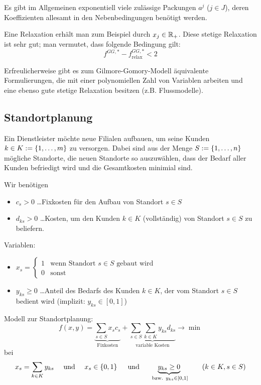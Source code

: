 \begin{description}
	Es gibt im Allgemeinen exponentiell viele zulässige Packungen $a^j$ ($j \in J$), deren Koeffizienten allesamt in den Nebenbedingungen benötigt werden.
	
	Eine Relaxation erhält man zum Beispiel durch $x_j \in \mathbb{R}_+$. Diese stetige Relaxation ist sehr gut; man vermutet, dass folgende Bedingung gilt:
	\begin{equation*}
		f^{GG, \ast} - f^{GG, \ast}_\text{relax} < 2
	\end{equation*}
\end{description}

Erfreulicherweise gibt es zum Gilmore-Gomory-Modell äquivalente Formulierungen, die mit einer polynomiellen Zahl von Variablen arbeiten und eine ebenso gute stetige Relaxation besitzen (z.B. Flussmodelle).


\subsection{Standortplanung}
Ein Dienstleister möchte neue Filialen aufbauen, um seine Kunden $k \in K \mathrel{:=} \left\{ 1, \dots , m \right\}$ zu versorgen. Dabei sind aus der Menge $S \mathrel{:=} \left\{ 1, \dots , n \right\}$ mögliche Standorte, die neuen Standorte so auszuwählen, dass der Bedarf aller Kunden befriedigt wird und die Gesamtkosten minimial sind.

Wir benötigen
\begin{itemize}[nolistsep, topsep=-\parskip]
	\item $c_s > 0$ \dots Fixkosten für den Aufbau von Standort $s \in S$
	\item $d_{ks} > 0$ \dots Kosten, um den Kunden $k \in K$ (vollständig) von Standort $s \in S$ zu beliefern.
\end{itemize}

Variablen:
\begin{itemize}[nolistsep, topsep=-\parskip]
	\item $x_s = \begin{cases} 1 & \text{wenn Standort } s \in S \text{ gebaut wird} \\ 0 & \text{sonst} \end{cases}$ 
	\item $y_{ks} \ge 0$ \dots Anteil des Bedarfs des Kunden $k \in K$, der vom Standort $s \in S$ bedient wird (implizit: $y_{ks} \in [0,1]$)
\end{itemize}

Modell zur Standortplanung:
\begin{equation*}
	f(x,y) = \underbrace{\sum_{s \in S} x_s c_s}_{\text{Fixkosten}}  + \underbrace{\sum_{s \in S} \sum_{k \in K} y_{ks} d_{ks}}_{\text{variable Kosten}} \to \min
\end{equation*}
bei
\begin{equation*}
	x_s = \sum_{k \in K} y_{ks} \quad \text{ und } \quad x_s \in \left\{ 0,1 \right\} \quad \text{ und } \quad \underbrace{y_{ks} \ge 0}_{\text{ bzw. } y_{ks} \in [0,1]} \qquad (k \in K, s \in S)
\end{equation*}

